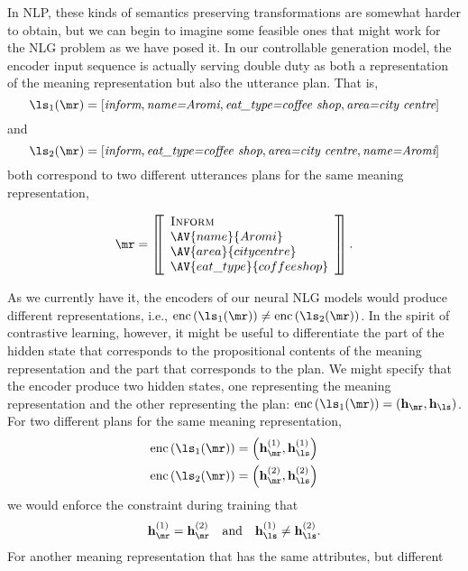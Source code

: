 In NLP, these kinds of semantics preserving transformations are somewhat
harder to obtain, but we can begin to imagine some feasible ones that might
work for the NLG problem as we have posed it. In our controllable generation
model, the encoder input sequence is actually serving double duty as both a
representation of the meaning representation but also the utterance plan. That
is, 
\[ 
    \ls_1(\mr) = \left[
    \textit{inform}, \textit{name=Aromi}, \textit{eat\_type=coffee shop}, 
    \textit{area=city centre} \right] 
\] 
and
\[
    \ls_2(\mr) = \left[
        \textit{inform}, \textit{eat\_type=coffee shop}, 
    \textit{area=city centre}, \textit{name=Aromi} \right]
\]
both correspond to two different utterances plans for the same meaning
representation,\begin{singlespace}\[
    \mr = \left[\!\!\left[  \begin{array}{l} \textsc{Inform} \\ \AV{name}{Aromi} \\ \AV{area}{city centre} \\ \AV{eat\_type}{coffee shop} \end{array} \right]\!\!\right].
\]\end{singlespace}
\noindent As we currently have it, the encoders of our neural NLG models would produce
different representations, i.e., $\operatorname{enc}\left(\ls_1(\mr)\right) \ne \operatorname{enc}\left(\ls_2(\mr)\right)$. In the spirit of contrastive
learning, however, it might be useful to differentiate the part of the hidden 
state that corresponds to the propositional contents of the  meaning representation and the part that
corresponds to the plan. We might specify that the encoder produce two
hidden states, one representing the meaning representation and the other
representing the plan: $\operatorname{enc}\left(\ls_1(\mr)\right) = \left(\mathbf{h}_\mr, \mathbf{h}_{\ls}\right)$. For two different plans for the same
meaning representation,  \begin{align*}
    \operatorname{enc}\left(\ls_1(\mr)\right) &= \left(\mathbf{h}^{(1)}_\mr, \mathbf{h}^{(1)}_{\ls}\right)\\
    \operatorname{enc}\left(\ls_2(\mr)\right) &= \left(\mathbf{h}^{(2)}_\mr, \mathbf{h}^{(2)}_{\ls}\right)\\
\end{align*}
we would enforce the constraint during training
that
\[ \mathbf{h}^{(1)}_\mr = \mathbf{h}^{(2)}_\mr \quad \textrm{and} \quad  \mathbf{h}^{(1)}_{\ls} \ne  \mathbf{h}^{(2)}_{\ls}. \]
For another meaning representation that has the same attributes, but different
